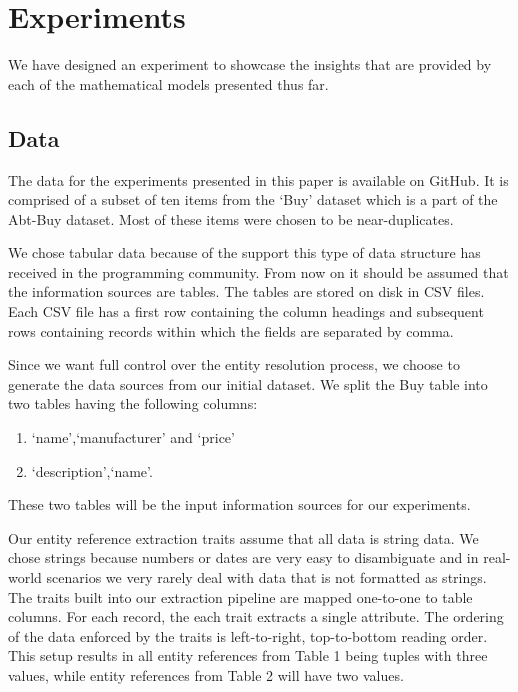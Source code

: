 \documentclass[11pt]{article}
\begin{document}
    \section{Experiments}

    We have designed an experiment to showcase the insights that are provided by
    each of the mathematical models presented thus far.

    \subsection{Data}

    The data for the experiments presented in this paper is available on
    GitHub\cite{expdata2023}.
    It is comprised of a subset of ten items from the `Buy' dataset which is a
    part of the Abt-Buy dataset\cite{vldb2010}.
    Most of these items were chosen to be near-duplicates.
    
    We chose tabular data because of the support this type of data structure has
    received in the programming community\cite{pandas2010,pandas2023}.
    From now on it should be assumed that the information sources are tables.
    The tables are stored on disk in CSV files.
    Each CSV file has a first row containing the column headings and subsequent
    rows containing records within which the fields are separated by comma.
    
    Since we want full control over the entity resolution process, we choose to
    generate the data sources from our initial dataset.
    We split the Buy table into two tables having the following columns:
    \begin{enumerate}[label=\textbullet~Table~\arabic*:,leftmargin=*]
        \item `name',`manufacturer' and `price'
        \item `description',`name'.
    \end{enumerate}
    These two tables will be the input information sources for our experiments.

    Our entity reference extraction traits assume that all data is string data.
    We chose strings because numbers or dates are very easy to disambiguate and
    in real-world scenarios we very rarely deal with data that is not formatted
    as strings.
    The traits built into our extraction pipeline are mapped one-to-one to table
    columns.
    For each record, the each trait extracts a single attribute.
    The ordering of the data enforced by the traits is left-to-right,
    top-to-bottom reading order.
    This setup results in all entity references from Table 1 being tuples with
    three values, while entity references from Table 2 will have two values.
\end{document}
